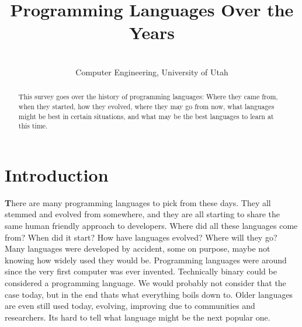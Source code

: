 \documentclass[letterpaper, 10 pt, conference]{IEEEtran}
\title{Programming Languages Over the Years}
\author{\textbf{}\\
Computer Engineering, University of Utah}
\begin{document}
\maketitle 	
\makeatletter
\def\ps@headings{%
\def\@oddhead{\mbox{}\scriptsize\rightmark \hfil \thepage}%
\def\@evenhead{\scriptsize\thepage \hfil \leftmark\mbox{}}%
\def\@oddfoot{\scriptsize \@date\hfil PLOTY}%
\def\@evenfoot{\scriptsize PLOTY...\hfil \@date}}
\makeatother

\pagestyle{headings}

\begin{abstract}
This survey goes over the history of programming languages: Where they came from, when they started, how they evolved, where they may go from now, what languages might be best in certain situations, and what may be the best languages to learn at this time.
\end{abstract}

\section{Introduction}
\lettrine[findent=2pt]{\textbf{T}}{}here are many programming languages to pick from these days. They all stemmed and evolved from somewhere, and they are all starting to share the same human friendly approach to developers. Where did all these languages come from? When did it start? How have languages evolved? Where will they go? Many languages were developed by accident, some on purpose, maybe not knowing how widely used they would be. Programming languages were around since the very first computer was ever invented. Technically binary could be considered a programming language. We would probably not consider that the case today, but in the end thats what everything boils down to. Older languages are even still used today, evolving, improving due to communities and researchers. Its hard to tell what language might be the next popular one. 
\end{document}
